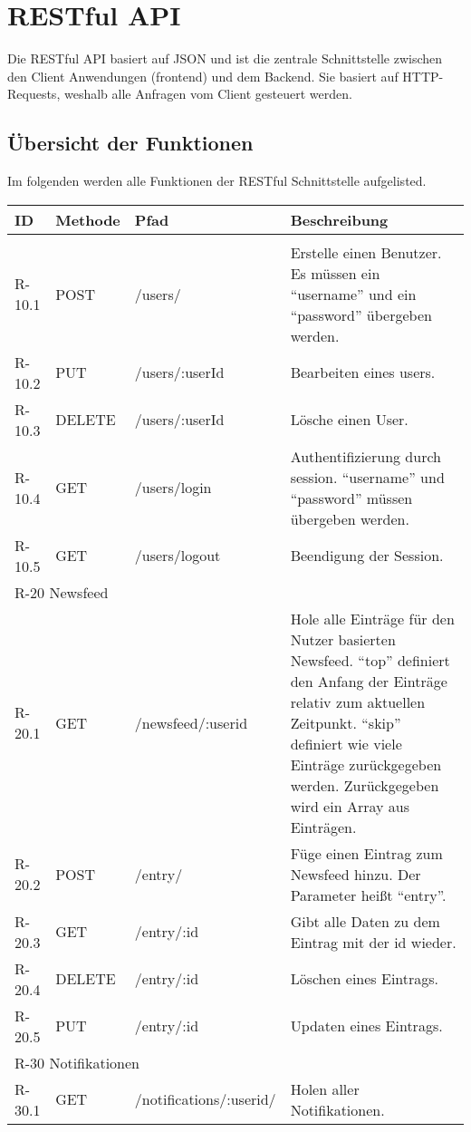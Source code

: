 \chapter{RESTful API}
Die RESTful API basiert auf JSON und ist die zentrale Schnittstelle zwischen den Client Anwendungen (frontend) und dem Backend.
Sie basiert auf HTTP-Requests, weshalb alle Anfragen vom Client gesteuert werden.

\section{Übersicht der Funktionen}
Im folgenden werden alle Funktionen der RESTful Schnittstelle aufgelisted. 
\begin{tabularx}{\textwidth}{|l|l|l|X|}
    \toprule
    \textbf{ID} & \textbf{Methode} & \textbf{Pfad} & \textbf{Beschreibung} \\
    \midrule
    \endhead
    \hline
    \caption{RESTful Pfade}
    \label{RESTful:pfade}
    \endfoot

    \multicolumn{4}{|l|}{R-10 Userverwaltung}\\
    \hline

    R-10.1 & POST & /users/ & Erstelle einen Benutzer. Es müssen ein \enquote{username} und ein \enquote{password} übergeben werden.\\
    R-10.2 & PUT & /users/:userId & Bearbeiten eines users.\\
    R-10.3 & DELETE & /users/:userId & Lösche einen User.\\
    R-10.4 & GET & /users/login & Authentifizierung durch session. \enquote{username} und \enquote{password} müssen übergeben werden.\\
    R-10.5 & GET & /users/logout & Beendigung der Session.\\

    \hline
    \multicolumn{4}{|l|}{R-20 Newsfeed}\\
    \hline

    R-20.1 & GET & /newsfeed/:userid & Hole alle Einträge für den Nutzer basierten Newsfeed. \enquote{top} definiert den Anfang der Einträge relativ zum aktuellen Zeitpunkt. \enquote{skip} definiert wie viele Einträge zurückgegeben werden. Zurückgegeben wird ein Array aus Einträgen.\\ 
    R-20.2 & POST & /entry/ & Füge einen Eintrag zum Newsfeed hinzu. Der Parameter heißt \enquote{entry}.\\ 
    R-20.3 & GET & /entry/:id & Gibt alle Daten zu dem Eintrag mit der id wieder.\\
    R-20.4 & DELETE & /entry/:id & Löschen eines Eintrags.\\
    R-20.5 & PUT & /entry/:id & Updaten eines Eintrags.\\

    \hline
    \multicolumn{4}{|l|}{R-30 Notifikationen}\\
    \hline
    R-30.1 & GET & /notifications/:userid/ & Holen aller Notifikationen.\\ 


\end{tabularx}

